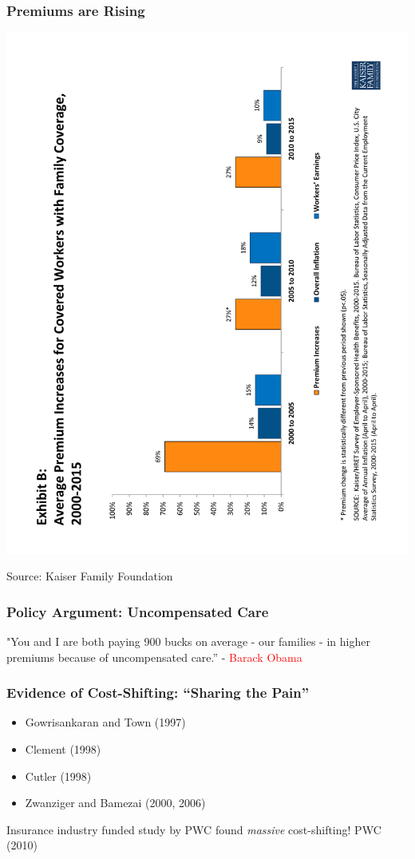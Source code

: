 \documentclass[ucs,9pt]{beamer}
\begin{document}
\begin{frame}
\frametitle{Premiums are Rising}
\begin{center}
\includegraphics[angle=-90, scale=0.4]{prem}
\end{center}
\tiny Source: Kaiser Family Foundation  
\end{frame}

\begin{frame}
\frametitle{Policy Argument: Uncompensated Care}
"You and I are both paying 900 bucks on average - our families - in higher premiums because of uncompensated care.''  - \textcolor{red}{Barack Obama}
\end{frame}



\begin{frame}
\frametitle{Evidence of Cost-Shifting: ``Sharing the Pain''}
\begin{itemize}
\item Gowrisankaran and Town (1997)
\item Clement (1998)
\item Cutler (1998)
\item  Zwanziger and Bamezai (2000, 2006)
\end{itemize}
\pause
\small Insurance industry funded study by PWC found \textit{massive} cost-shifting! PWC (2010)
\end{frame}
\end{document}
